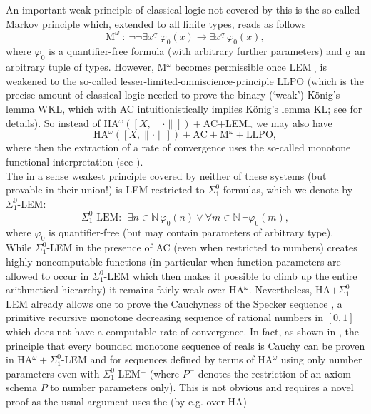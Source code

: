 \documentclass[1p]{elsarticle}
\newcommand{\NN}{\ensuremath{\mathbb{N}}}
\theoremstyle{plain}
\theoremstyle{definition}
\theoremstyle{remark}
\theoremstyle{definition}
\begin{document}
An important weak principle of classical logic not covered by this is 
the so-called Markov principle which, extended to all finite types, reads 
as follows 
\[ \mbox{M}^{\omega}\ :\ 
\neg\neg\exists \underline{x}^{\underline{\sigma}} \ 
\varphi_0(\underline{x})\to 
\exists \underline{x}^{\underline{\sigma}}\,\varphi_0(\underline{x}), \] 
where $\varphi_0$ is a quantifier-free formula (with arbitrary further 
parameters) and $\underline{\sigma}$ an 
arbitrary tuple of types. However, M$^{\omega}$ becomes permissible once 
LEM$_{\neg}$ is weakened to the so-called lesser-limited-omniscience-principle 
LLPO (which is the precise amount of classical logic needed to prove the 
binary (`weak') K\"onig's lemma WKL, which with AC intuitionistically implies 
K\"onig's lemma KL; see \cite{Kohlenbach(book)} for details).
So instead of HA$^{\omega}([X,\|\cdot\|])+$AC$+$LEM$_{\neg}$ we may also have 
\[ \mbox{HA$^{\omega}([X,\|\cdot \| ])+$AC$+$M$^{\omega}+$LLPO}, \] 
where then the extraction of a rate of convergence uses the so-called 
monotone functional interpretation (see \cite{Kohlenbach(book)}).
\\[2mm] The in a sense weakest principle covered by neither of these systems 
(but provable in their union!) is LEM restricted to $\Sigma^0_1$-formulas, 
which we denote by $\Sigma^0_1$-LEM: 
\[ \Sigma^0_1\mbox{-LEM}: \ \ \exists n\in\NN \,\varphi_0(n)\vee
\forall m\in\NN\,\neg \varphi_0(m), \]
where $\varphi_0$ is quantifier-free (but may contain parameters of 
arbitrary type). \\  
While $\Sigma^0_1$-LEM in the presence of 
AC (even when restricted to numbers) 
creates highly noncomputable functions (in particular when function 
parameters are allowed to occur in $\Sigma^0_1$-LEM which then makes it 
possible to climb up the entire arithmetical hierarchy) it remains fairly 
weak over HA$^{\omega}.$ Nevertheless, HA$+\Sigma^0_1$-LEM 
already allows one
to prove the Cauchyness of the Specker sequence \cite{Specker(49)}, 
a primitive recursive 
monotone decreasing sequence of rational numbers in $[0,1]$ which does not 
have a computable rate of convergence. In fact, as shown in \cite{Toftdal}, 
the principle that every bounded monotone sequence of reals is Cauchy can be 
proven in HA$^{\omega}+\Sigma^0_1$-LEM and for sequences defined by terms 
of HA$^{\omega}$ using only number parameters even with 
$\Sigma^0_1$-LEM$^-$ (where $P^-$ denotes the restriction of an axiom 
schema $P$ to number parameters only). This is not obvious and requires 
a novel 
proof as the usual argument uses the (by \cite{Akama} e.g. over HA) 
\end{document}
